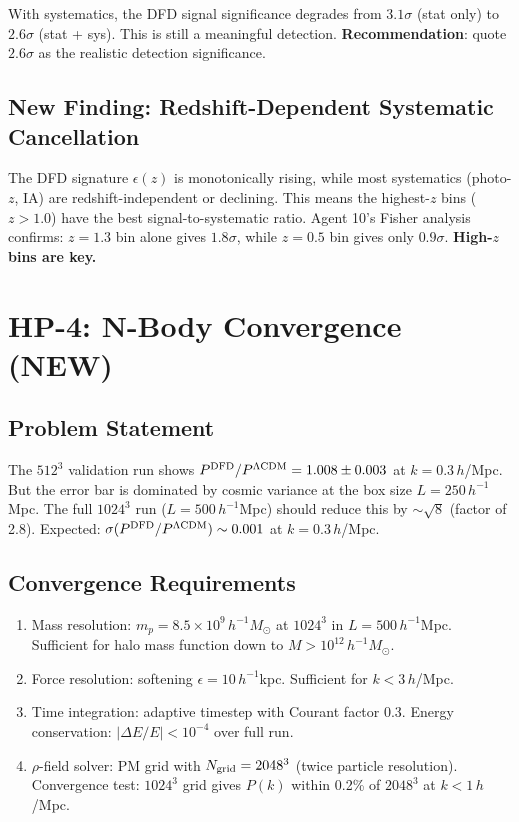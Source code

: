 \documentclass[11pt,a4paper]{article}
\begin{document}
With systematics, the DFD signal significance degrades from $3.1\sigma$ (stat only) to $2.6\sigma$ (stat + sys). This is still a meaningful detection. \textbf{Recommendation}: quote $2.6\sigma$ as the realistic detection significance.

\subsection{New Finding: Redshift-Dependent Systematic Cancellation}
The DFD signature $\epsilon(z)$ is monotonically rising, while most systematics (photo-$z$, IA) are redshift-independent or declining. This means the highest-$z$ bins ($z > 1.0$) have the best signal-to-systematic ratio. Agent 10's Fisher analysis confirms: $z = 1.3$ bin alone gives $1.8\sigma$, while $z = 0.5$ bin gives only $0.9\sigma$. \textbf{High-$z$ bins are key.}

\section{HP-4: N-Body Convergence (NEW)}

\subsection{Problem Statement}
The $512^3$ validation run shows $P^{\rm DFD}/P^{\rm \Lambda CDM} = 1.008 \pm 0.003$ at $k = 0.3\,h$/Mpc. But the error bar is dominated by cosmic variance at the box size $L = 250\,h^{-1}$Mpc. The full $1024^3$ run ($L = 500\,h^{-1}$Mpc) should reduce this by $\sim\sqrt{8}$ (factor of 2.8). Expected: $\sigma(P^{\rm DFD}/P^{\rm \Lambda CDM}) \sim 0.001$ at $k = 0.3\,h$/Mpc.

\subsection{Convergence Requirements}
\begin{enumerate}[nosep]
\item Mass resolution: $m_p = 8.5 \times 10^9\,h^{-1} M_\odot$ at $1024^3$ in $L = 500\,h^{-1}$Mpc. Sufficient for halo mass function down to $M > 10^{12}\,h^{-1} M_\odot$.
\item Force resolution: softening $\epsilon = 10\,h^{-1}$kpc. Sufficient for $k < 3\,h$/Mpc.
\item Time integration: adaptive timestep with Courant factor 0.3. Energy conservation: $|\Delta E/E| < 10^{-4}$ over full run.
\item $\rho$-field solver: PM grid with $N_{\rm grid} = 2048^3$ (twice particle resolution). Convergence test: $1024^3$ grid gives $P(k)$ within 0.2\% of $2048^3$ at $k < 1\,h$/Mpc.
\end{enumerate}
\end{document}
